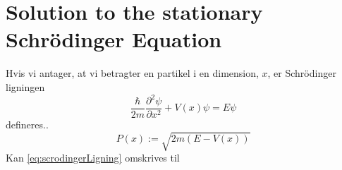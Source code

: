 \section{Solution to the stationary Schrödinger Equation}
Hvis vi antager, at vi betragter en partikel i en dimension, $x$,  er Schrödinger ligningen
\begin{equation}
    \frac{\hbar}{2m}\frac{\partial^2 \psi}{\partial x^2} + V(x) \psi = E \psi
    \label{eq:scrodingerLigning}
\end{equation}
defineres..
\begin{equation}
P(x) := \sqrt{2m(E-V(x))}
\end{equation}
Kan \cref{eq:scrodingerLigning} omskrives til
